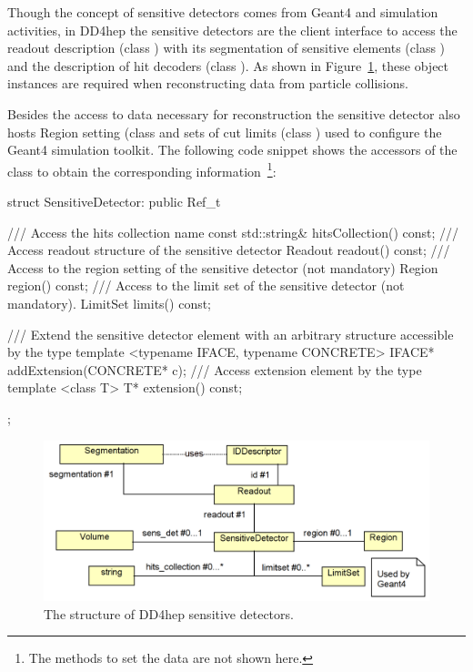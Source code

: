 \documentclass[10pt,a4paper]{article}
\begin{document}
\noindent
Though the concept of sensitive detectors comes from Geant4 and simulation 
activities, in DD4hep the sensitive detectors are the client interface to 
access the readout description (class ) with its 
segmentation of sensitive elements (class ) and
the description of hit decoders (class ).
As shown in Figure~\ref{fig:dd4hep-sensitive-detectors}, these object 
instances are required when reconstructing data from particle collisions.

\noindent
Besides the access to data necessary for reconstruction the sensitive detector
also hosts Region setting (class  and sets of cut limits
(class ) used to configure the Geant4 simulation toolkit.
The following code snippet shows the accessors of the 
 class to obtain the corresponding 
information~\footnote{The methods to set the data are not shown here.}:


\vspace{0.3cm}
\begin{code}
    struct SensitiveDetector: public Ref_t {
      /// Access the hits collection name
      const std::string& hitsCollection() const;
      /// Access readout structure of the sensitive detector
      Readout readout() const;
      /// Access to the region setting of the sensitive detector (not mandatory)
      Region region() const;
      /// Access to the limit set of the sensitive detector (not mandatory).
      LimitSet limits() const;

      /// Extend the sensitive detector element with an arbitrary structure accessible by the type
      template <typename IFACE, typename CONCRETE> IFACE* addExtension(CONCRETE* c);
      /// Access extension element by the type
      template <class T> T* extension() const;
   };
\end{code}

\begin{figure}[h]
  \begin{center}
    \includegraphics[width=140mm] {DD4hep-sensitive-detectors.png}
    \caption{The structure of DD4hep sensitive detectors.}
    \label{fig:dd4hep-sensitive-detectors}
  \end{center}
  \vspace{-0.6cm}
\end{figure}
\end{document}
